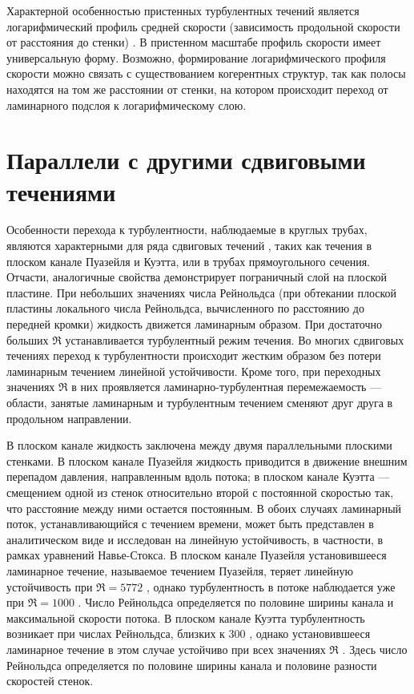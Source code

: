 Характерной особенностью пристенных турбулентных течений является логарифмический профиль средней скорости (зависимость продольной скорости от расстояния до стенки) \cite{Kim1987}. В пристенном масштабе профиль скорости имеет универсальную форму. Возможно, формирование логарифмического профиля скорости можно связать с существованием когерентных структур, так как полосы находятся на том же расстоянии от стенки, на котором происходит переход от ламинарного подслоя к логарифмическому слою.


\section{Параллели с другими сдвиговыми течениями}

Особенности перехода к турбулентности, наблюдаемые в круглых трубах, являются характерными для ряда сдвиговых течений \cite{Manneville2015, Manneville2016}, таких как течения в плоском канале Пуазейля и Куэтта, или в трубах прямоугольного сечения. Отчасти, аналогичные свойства демонстрирует пограничный слой на плоской пластине. При небольших значениях числа Рейнольдса (при обтекании плоской пластины локального числа Рейнольдса, вычисленного по расстоянию до передней кромки) жидкость движется ламинарным образом. При достаточно больших $\Re$ устанавливается турбулентный режим течения. Во многих сдвиговых течениях переход к турбулентности происходит жестким образом без потери ламинарным течением линейной устойчивости. Кроме того, при переходных значениях $\Re$ в них проявляется ламинарно-турбулентная перемежаемость --- области, занятые ламинарным и турбулентным течением сменяют друг друга в продольном направлении.  

В плоском канале жидкость заключена между двумя параллельными плоскими стенками. В плоском канале Пуазейля жидкость приводится в движение внешним перепадом давления, направленным вдоль потока; в плоском канале Куэтта --- смещением одной из стенок относительно второй с постоянной скоростью так, что расстояние между ними остается постоянным. В обоих случаях ламинарный поток, устанавливающийся с течением времени, может быть представлен в аналитическом виде и исследован на линейную устойчивость, в частности, в рамках уравнений Навье-Стокса. В плоском канале Пуазейля установившееся ламинарное течение, называемое течением Пуазейля, теряет линейную устойчивость при $\Re = 5772$ \cite{Orszag1971}, однако турбулентность в потоке наблюдается уже при $\Re = 1000$ \cite{Orszag1980}. Число Рейнольдса определяется по половине ширины канала и максимальной скорости потока. В плоском канале Куэтта турбулентность возникает при числах Рейнольдса, близких к $300$ \cite{Bottin1998}, однако установившееся ламинарное течение в этом случае устойчиво при всех значениях $\Re$ \cite{Romanov1973}. Здесь число Рейнольдса определяется по половине ширины канала и половине разности скоростей стенок. 

